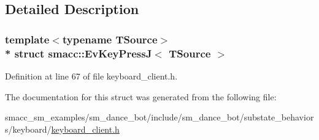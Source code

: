 \subsection{Detailed Description}
\subsubsection*{template$<$typename T\+Source$>$\\*
struct smacc\+::\+Ev\+Key\+Press\+J$<$ T\+Source $>$}



Definition at line 67 of file keyboard\+\_\+client.\+h.



The documentation for this struct was generated from the following file\+:\begin{DoxyCompactItemize}
\item 
smacc\+\_\+sm\+\_\+examples/sm\+\_\+dance\+\_\+bot/include/sm\+\_\+dance\+\_\+bot/substate\+\_\+behaviors/keyboard/\hyperlink{keyboard__client_8h}{keyboard\+\_\+client.\+h}\end{DoxyCompactItemize}
